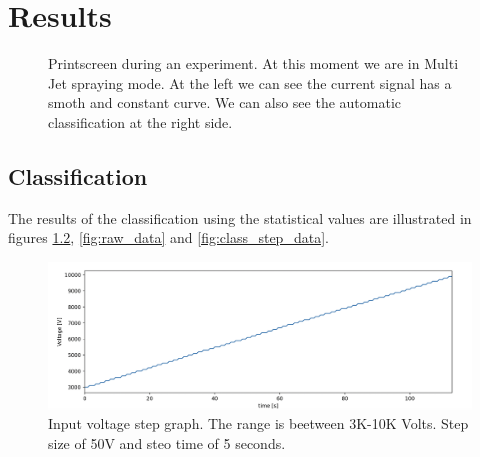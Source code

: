 \chapter{Results}
\label{chap:Results}



\begin{figure}[H]
    \centering
    \caption{Printscreen during an experiment. At this moment we are in Multi Jet spraying mode. At the left we can see the current signal has a smoth and constant curve. We can also see the automatic classification at the right side.}
    \label{fig:multi_class_exp}
\end{figure}


\section{Classification}
\label{sec:classification_results}

The results of the classification using the statistical values are illustrated in figures \ref{fig:step_voltage}, \ref{fig:raw_data} and \ref{fig:class_step_data}.


\begin{figure}[H]
    \center
    \includegraphics[width=12cm]{Figuras/19:03/voltage_step.png}
    \caption{Input voltage step graph. The range is beetween 3K-10K Volts. Step size of 50V and steo time of 5 seconds.}
    \label{fig:step_voltage}
\end{figure}


